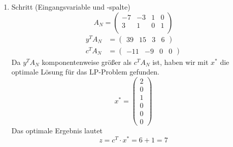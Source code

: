 \documentclass[a4paper]{scrartcl}
\begin{document}
\begin{enumerate}[label=\bfseries\arabic*.]
\begin{enumerate}[1.]
\begin{enumerate}[1.]
                    \item Schritt (Eingangsvariable und -spalte)
                        \begin{equation}
                            A_N =
                            \begin{pmatrix}
                                -7 & -3 & 1 & 0 \\
                                 3 &  1 & 0 & 1 \\
                            \end{pmatrix}
                        \end{equation}
                        \begin{align}
                            y^TA_N &=
                            \begin{pmatrix}
                                39 & 15 & 3 & 6
                            \end{pmatrix} \\
                            c^TA_N &=
                            \begin{pmatrix}
                                -11 & -9 & 0 & 0
                            \end{pmatrix}
                        \end{align}
                        Da $y^TA_N$ komponentenweise größer als $c^TA_N$
                        ist, haben wir mit $x^*$ die optimale Lösung für
                        das LP-Problem gefunden.
                        \begin{equation}
                            x^* =
                            \begin{pmatrix}
                                2 \\ 0 \\ 1 \\ 0 \\ 0 \\ 0
                            \end{pmatrix}
                        \end{equation}
                        Das optimale Ergebnis lautet
                        \begin{equation}
                            z = c^T \cdot x^* = 6 + 1 = 7
                        \end{equation}

                \end{enumerate}

        \end{enumerate}


\end{enumerate}
\end{document}
